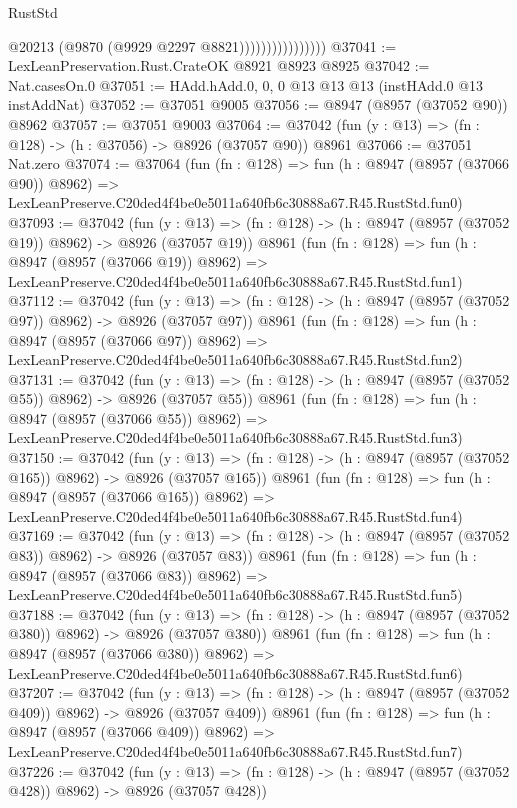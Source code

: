 \begin{lexlean}{RustStd}
\begin{coremodule}
                                @20213
                                (@9870 (@9929 @2297 @8821))))))))))))))))
@37041 := LexLeanPreservation.Rust.CrateOK @8921 @8923 @8925
@37042 := Nat.casesOn.{0}
@37051 := HAdd.hAdd.{0, 0, 0} @13 @13 @13 (instHAdd.{0} @13 instAddNat)
@37052 := @37051 @9005
@37056 := @8947 (@8957 (@37052 @90)) @8962
@37057 := @37051 @9003
@37064 := @37042 (fun (y : @13) => (fn : @128) -> (h : @37056) -> @8926 (@37057 @90)) @8961
@37066 := @37051 Nat.zero
@37074 := @37064
    (fun (fn : @128) =>
    fun (h : @8947 (@8957 (@37066 @90)) @8962) =>
    LexLeanPreserve.C20ded4f4be0e5011a640fb6c30888a67.R45.RustStd.fun0)
@37093 := @37042
    (fun (y : @13) => (fn : @128) -> (h : @8947 (@8957 (@37052 @19)) @8962) -> @8926 (@37057 @19))
    @8961
    (fun (fn : @128) =>
    fun (h : @8947 (@8957 (@37066 @19)) @8962) =>
    LexLeanPreserve.C20ded4f4be0e5011a640fb6c30888a67.R45.RustStd.fun1)
@37112 := @37042
    (fun (y : @13) => (fn : @128) -> (h : @8947 (@8957 (@37052 @97)) @8962) -> @8926 (@37057 @97))
    @8961
    (fun (fn : @128) =>
    fun (h : @8947 (@8957 (@37066 @97)) @8962) =>
    LexLeanPreserve.C20ded4f4be0e5011a640fb6c30888a67.R45.RustStd.fun2)
@37131 := @37042
    (fun (y : @13) => (fn : @128) -> (h : @8947 (@8957 (@37052 @55)) @8962) -> @8926 (@37057 @55))
    @8961
    (fun (fn : @128) =>
    fun (h : @8947 (@8957 (@37066 @55)) @8962) =>
    LexLeanPreserve.C20ded4f4be0e5011a640fb6c30888a67.R45.RustStd.fun3)
@37150 := @37042
    (fun (y : @13) => (fn : @128) -> (h : @8947 (@8957 (@37052 @165)) @8962) -> @8926 (@37057 @165))
    @8961
    (fun (fn : @128) =>
    fun (h : @8947 (@8957 (@37066 @165)) @8962) =>
    LexLeanPreserve.C20ded4f4be0e5011a640fb6c30888a67.R45.RustStd.fun4)
@37169 := @37042
    (fun (y : @13) => (fn : @128) -> (h : @8947 (@8957 (@37052 @83)) @8962) -> @8926 (@37057 @83))
    @8961
    (fun (fn : @128) =>
    fun (h : @8947 (@8957 (@37066 @83)) @8962) =>
    LexLeanPreserve.C20ded4f4be0e5011a640fb6c30888a67.R45.RustStd.fun5)
@37188 := @37042
    (fun (y : @13) => (fn : @128) -> (h : @8947 (@8957 (@37052 @380)) @8962) -> @8926 (@37057 @380))
    @8961
    (fun (fn : @128) =>
    fun (h : @8947 (@8957 (@37066 @380)) @8962) =>
    LexLeanPreserve.C20ded4f4be0e5011a640fb6c30888a67.R45.RustStd.fun6)
@37207 := @37042
    (fun (y : @13) => (fn : @128) -> (h : @8947 (@8957 (@37052 @409)) @8962) -> @8926 (@37057 @409))
    @8961
    (fun (fn : @128) =>
    fun (h : @8947 (@8957 (@37066 @409)) @8962) =>
    LexLeanPreserve.C20ded4f4be0e5011a640fb6c30888a67.R45.RustStd.fun7)
@37226 := @37042
    (fun (y : @13) => (fn : @128) -> (h : @8947 (@8957 (@37052 @428)) @8962) -> @8926 (@37057 @428))

\end{coremodule}
\end{lexlean}
